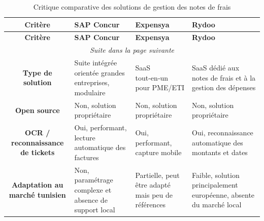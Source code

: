 \documentclass[12pt,a4paper]{report}
\begin{document}
\begin{longtable}{|c|p{3cm}|p{3cm}|p{3cm}|}

\caption{Critique comparative des solutions de gestion des notes de frais}

\label{tab:critique_existant}\\

\hline



\textbf{Critère} & \textbf{SAP Concur} & \textbf{Expensya} & \textbf{Rydoo} \\

\hline

\endfirsthead



\hline



\textbf{Critère} & \textbf{SAP Concur} & \textbf{Expensya} & \textbf{Rydoo} \\

\hline

\endhead



\hline

\multicolumn{4}{|c|}{\textit{Suite dans la page suivante}} \\

\hline

\endfoot



\hline

\endlastfoot



\textbf{Type de solution} & Suite intégrée orientée grandes entreprises, modulaire & SaaS tout‑en‑un pour PME/ETI & SaaS dédié aux notes de frais et à la gestion des dépenses \\

\hline

\textbf{Open source} & Non, solution propriétaire & Non, solution propriétaire & Non, solution propriétaire \\

\hline

\textbf{OCR / reconnaissance de tickets} & Oui, performant, lecture automatique des factures & Oui, performant, capture mobile & Oui, reconnaissance automatique des montants et dates \\

\hline

\textbf{Adaptation au marché tunisien} & Non, paramétrage complexe et absence de support local & Partielle, peut être adapté mais peu de références & Faible, solution principalement européenne, absente du marché local \\


\end{longtable}
\end{document}
